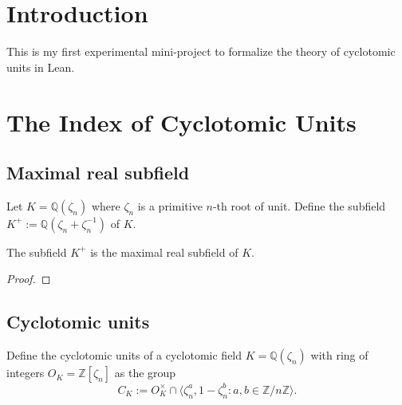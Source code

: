 %

\chapter{Introduction}
This is my first experimental mini-project 
to formalize the theory of cyclotomic units in Lean. 

\chapter{The Index of Cyclotomic Units}

\section{Maximal real subfield}
\begin{defn}\label{defn:Kplus}
    \notready
    Let $K = \mathbb{Q}(\zeta_n)$ where $\zeta_n$ is a primitive $n$-th root of unit. 
    Define the subfield $K^+ := \mathbb{Q}(\zeta_n + \zeta_n^{-1})$ of $K$.
\end{defn}

\begin{lem}\label{lem:Kplus}
    \notready
    The subfield $K^+$ is the maximal real subfield of $K$.
\end{lem}

\begin{proof}
\end{proof}

\section{Cyclotomic units}
\begin{defn}\label{defn:cyclo-units}
    \notready
    Define the cyclotomic units of a cyclotomic field $K = \mathbb{Q}(\zeta_n)$ with ring of integers 
    $O_K = \mathbb{Z}[\zeta_n]$ as the group 
    $$
    C_K := O_K^\times \cap \langle \zeta_n^a, 1 - \zeta_n^b \colon a, b \in \mathbb{Z} / n \mathbb{Z}\rangle. 
    $$
\end{defn}

